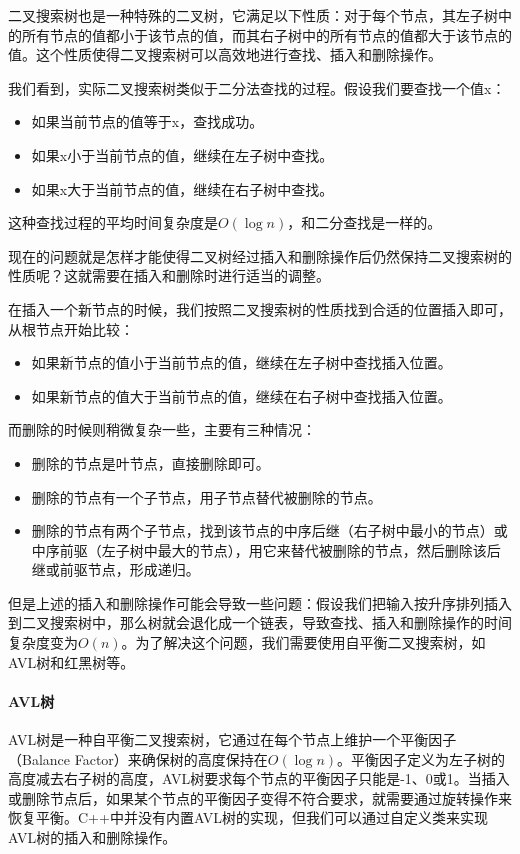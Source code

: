 二叉搜索树也是一种特殊的二叉树，它满足以下性质：对于每个节点，其左子树中的所有节点的值都小于该节点的值，而其右子树中的所有节点的值都大于该节点的值。这个性质使得二叉搜索树可以高效地进行查找、插入和删除操作。

我们看到，实际二叉搜索树类似于二分法查找的过程。假设我们要查找一个值x：
\begin{itemize}
    \item 如果当前节点的值等于x，查找成功。
    \item 如果x小于当前节点的值，继续在左子树中查找。
    \item 如果x大于当前节点的值，继续在右子树中查找。
\end{itemize}
这种查找过程的平均时间复杂度是$O(\log n)$，和二分查找是一样的。

现在的问题就是怎样才能使得二叉树经过插入和删除操作后仍然保持二叉搜索树的性质呢？这就需要在插入和删除时进行适当的调整。

在插入一个新节点的时候，我们按照二叉搜索树的性质找到合适的位置插入即可，从根节点开始比较：
\begin{itemize}
    \item 如果新节点的值小于当前节点的值，继续在左子树中查找插入位置。
    \item 如果新节点的值大于当前节点的值，继续在右子树中查找插入位置。
\end{itemize}
而删除的时候则稍微复杂一些，主要有三种情况：
\begin{itemize}
    \item 删除的节点是叶节点，直接删除即可。
    \item 删除的节点有一个子节点，用子节点替代被删除的节点。
    \item 删除的节点有两个子节点，找到该节点的中序后继（右子树中最小的节点）或中序前驱（左子树中最大的节点），用它来替代被删除的节点，然后删除该后继或前驱节点，形成递归。
\end{itemize}

但是上述的插入和删除操作可能会导致一些问题：假设我们把输入按升序排列插入到二叉搜索树中，那么树就会退化成一个链表，导致查找、插入和删除操作的时间复杂度变为$O(n)$。为了解决这个问题，我们需要使用自平衡二叉搜索树，如AVL树和红黑树等。

\paragraph{AVL树}

AVL树是一种自平衡二叉搜索树，它通过在每个节点上维护一个平衡因子（Balance Factor）来确保树的高度保持在$O(\log n)$。平衡因子定义为左子树的高度减去右子树的高度，AVL树要求每个节点的平衡因子只能是-1、0或1。当插入或删除节点后，如果某个节点的平衡因子变得不符合要求，就需要通过旋转操作来恢复平衡。C++中并没有内置AVL树的实现，但我们可以通过自定义类来实现AVL树的插入和删除操作。

